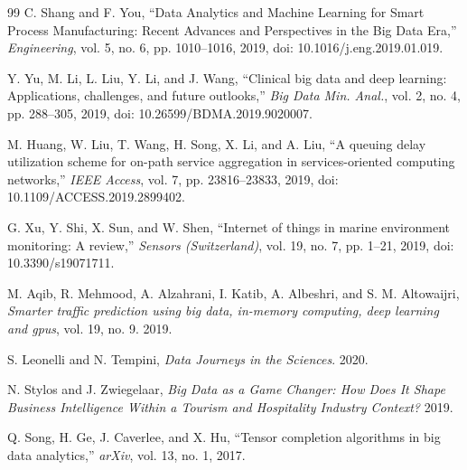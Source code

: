 \documentclass[10pt,a4paper]{article}
\begin{document}
\begin{thebibliography}{99}
C. Shang and F. You, ``Data Analytics and Machine Learning for Smart Process Manufacturing: Recent Advances and Perspectives in the Big Data Era,'' \textit{Engineering}, vol. 5, no. 6, pp. 1010--1016, 2019, doi: 10.1016/j.eng.2019.01.019.

Y. Yu, M. Li, L. Liu, Y. Li, and J. Wang, ``Clinical big data and deep learning: Applications, challenges, and future outlooks,'' \textit{Big Data Min. Anal.}, vol. 2, no. 4, pp. 288--305, 2019, doi: 10.26599/BDMA.2019.9020007.

M. Huang, W. Liu, T. Wang, H. Song, X. Li, and A. Liu, ``A queuing delay utilization scheme for on-path service aggregation in services-oriented computing networks,'' \textit{IEEE Access}, vol. 7, pp. 23816--23833, 2019, doi: 10.1109/ACCESS.2019.2899402.

G. Xu, Y. Shi, X. Sun, and W. Shen, ``Internet of things in marine environment monitoring: A review,'' \textit{Sensors (Switzerland)}, vol. 19, no. 7, pp. 1--21, 2019, doi: 10.3390/s19071711.

M. Aqib, R. Mehmood, A. Alzahrani, I. Katib, A. Albeshri, and S. M. Altowaijri, \textit{Smarter traffic prediction using big data, in-memory computing, deep learning and gpus}, vol. 19, no. 9. 2019.

S. Leonelli and N. Tempini, \textit{Data Journeys in the Sciences}. 2020.

N. Stylos and J. Zwiegelaar, \textit{Big Data as a Game Changer: How Does It Shape Business Intelligence Within a Tourism and Hospitality Industry Context?} 2019.

Q. Song, H. Ge, J. Caverlee, and X. Hu, ``Tensor completion algorithms in big data analytics,'' \textit{arXiv}, vol. 13, no. 1, 2017.
\end{thebibliography}
\endgroup
\end{document}
